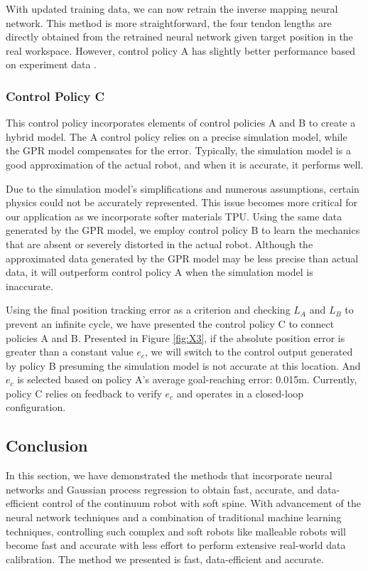 With updated training data, we can now retrain the inverse mapping neural network. This method is more straightforward, the four tendon lengths are directly obtained from the retrained neural network given target position in the real workspace. However, control policy A has slightly better performance based on experiment data \cite{wang2022data}. 


\subsubsection{Control Policy C}

This control policy incorporates elements of control policies A and B to create a hybrid model. The A control policy relies on a precise simulation model, while the GPR model compensates for the error. Typically, the simulation model is a good approximation of the actual robot, and when it is accurate, it performs well.

Due to the simulation model's simplifications and numerous assumptions, certain physics could not be accurately represented. This issue becomes more critical for our application as we incorporate softer materials TPU. Using the same data generated by the GPR model, we employ control policy B to learn the mechanics that are absent or severely distorted in the actual robot. Although the approximated data generated by the GPR model may be less precise than actual data, it will outperform control policy A when the simulation model is inaccurate. 

Using the final position tracking error as a criterion and checking $L_A$ and $L_B$ to prevent an infinite cycle, we have presented the control policy C to connect policies A and B. Presented in Figure \ref{fig:X3}, if the absolute position error is greater than a constant value $e_c$, we will switch to the control output generated by policy B presuming the simulation model is not accurate at this location. And $e_c$ is selected based on policy A's average goal-reaching error: 0.015m. Currently, policy C relies on feedback to verify $e_c$ and operates in a closed-loop configuration.


\subsection{Conclusion}

In this section, we have demonstrated the methods that incorporate neural networks and Gaussian process regression to obtain fast, accurate, and data-efficient control of the continuum robot with soft spine. With advancement of the neural network techniques and a combination of traditional machine learning techniques, controlling such complex and soft robots like malleable robots will become fast and accurate with less effort to perform extensive real-world data calibration. The method we presented is fast, data-efficient and accurate. 



\renewcommand\bibname{{References}}

